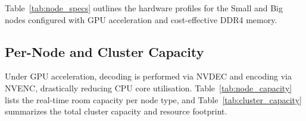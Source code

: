 \documentclass{article}
\begin{document}
Table~\ref{tab:node_specs} outlines the hardware profiles for the Small and Big nodes configured
with GPU acceleration and cost-effective DDR4 memory.

\begin{table}[htbp]
\centering
\caption{Node Types and Specifications (GPU-Accelerated, Lower DDR4)}
\label{tab:node_specs}
\noindent{}
\end{table}

\subsection{Per-Node and Cluster Capacity}

Under GPU acceleration, decoding is performed via NVDEC and encoding via NVENC, drastically
reducing CPU core utilisation. Table~\ref{tab:node_capacity} lists the real-time room capacity
per node type, and Table~\ref{tab:cluster_capacity} summarizes the total cluster capacity and resource footprint.

\begin{table}[htbp]
\centering
\caption{Real-Time Capacity per Node}
\label{tab:node_capacity}
\noindent{}
\end{table}
\end{document}
